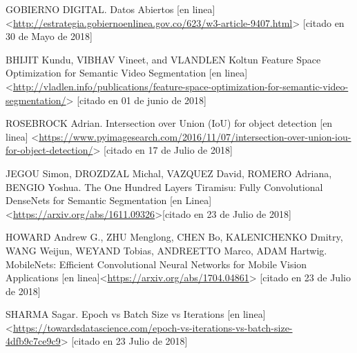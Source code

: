 GOBIERNO DIGITAL. Datos Abiertos [en linea] <\url{http://estrategia.gobiernoenlinea.gov.co/623/w3-article-9407.html}> [citado en 30 de Mayo de 2018]

BHIJIT Kundu, VIBHAV Vineet, and VLANDLEN Koltun Feature Space Optimization for Semantic Video Segmentation [en linea] <\url{http://vladlen.info/publications/feature-space-optimization-for-semantic-video-segmentation/}> [citado en 01 de junio de 2018]

ROSEBROCK Adrian. Intersection over Union (IoU) for object detection [en linea] <\url{https://www.pyimagesearch.com/2016/11/07/intersection-over-union-iou-for-object-detection/}> [citado en 17 de Julio de 2018]

JEGOU Simon, DROZDZAL Michal, VAZQUEZ David, ROMERO Adriana, BENGIO Yoshua. The One Hundred Layers Tiramisu: Fully Convolutional DenseNets for Semantic Segmentation [en Linea]<\url{https://arxiv.org/abs/1611.09326}>[citado en 23 de Julio de 2018]

HOWARD Andrew G., ZHU Menglong, CHEN Bo, KALENICHENKO Dmitry, WANG Weijun, WEYAND Tobias, ANDREETTO Marco, ADAM Hartwig. MobileNets: Efficient Convolutional Neural Networks for Mobile Vision Applications [en linea]<\url{https://arxiv.org/abs/1704.04861}> [citado en 23 de Julio de 2018]


SHARMA Sagar. Epoch vs Batch Size vs Iterations [en linea] <\url{https://towardsdatascience.com/epoch-vs-iterations-vs-batch-size-4dfb9c7ce9c9}> [citado en 23 Julio de 2018]


